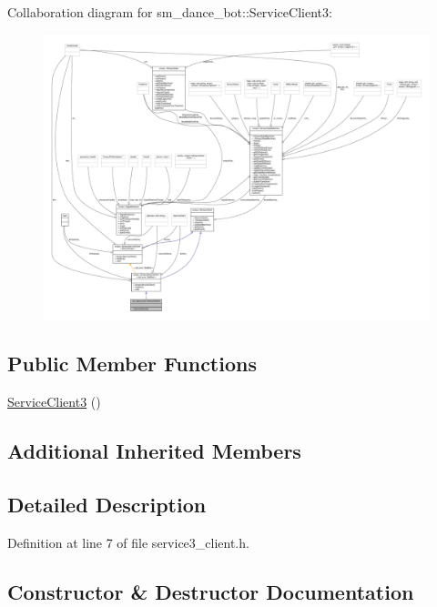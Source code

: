 Collaboration diagram for sm\+\_\+dance\+\_\+bot\+:\+:Service\+Client3\+:
\nopagebreak
\begin{figure}[H]
\begin{center}
\leavevmode
\includegraphics[width=350pt]{classsm__dance__bot_1_1ServiceClient3__coll__graph}
\end{center}
\end{figure}
\subsection*{Public Member Functions}
\begin{DoxyCompactItemize}
\item 
\hyperlink{classsm__dance__bot_1_1ServiceClient3_aaee85cfa4960a61eb03b8894a9f49331}{Service\+Client3} ()
\end{DoxyCompactItemize}
\subsection*{Additional Inherited Members}


\subsection{Detailed Description}


Definition at line 7 of file service3\+\_\+client.\+h.



\subsection{Constructor \& Destructor Documentation}
